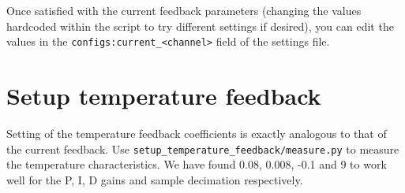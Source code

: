 \documentclass{article}
\begin{document}
Once satisfied with the current feedback parameters (changing the values hardcoded within the script to try different settings if desired), you can edit the values in the \texttt{configs:current\_<channel>} field of the settings file.

\clearpage
\section{Setup temperature feedback}

Setting of the temperature feedback coefficients is exactly analogous to that of the current feedback.
Use \texttt{setup\_temperature\_feedback/measure.py} to measure the temperature characteristics.
We have found 0.08, 0.008, -0.1 and 9 to work well for the P, I, D gains and sample decimation respectively.
\end{document}
